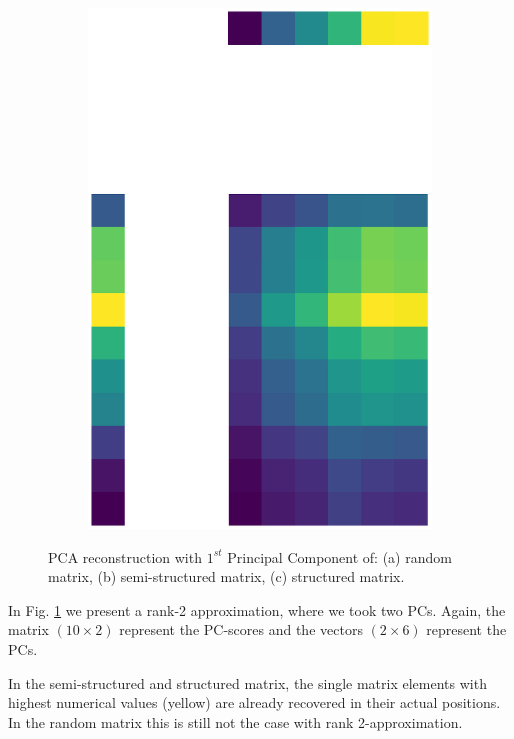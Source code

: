 \documentclass[10pt,twocolumn]{article}
\begin{document}
\begin{figure}[H]
\begin{subfigure}[t]{.15\textwidth}
\includegraphics[scale=.2]{DWGs/structured-matrix-reconstruction-PCs-1.eps}
\caption{ }
\end{subfigure}
\caption{PCA reconstruction with $1^{st}$ Principal Component of: (a) random matrix, (b) semi-structured matrix, (c) structured matrix.}
\label{fig:matrices-reconstruction}
\end{figure}

In Fig. \ref{fig:matrices-reconstruction} we present a rank-2 approximation, where we took two PCs. Again, the matrix $(10 \times 2)$ represent the PC-scores and the vectors $(2 \times 6)$ represent the PCs.

In the semi-structured and structured matrix, the single matrix elements with highest numerical values (yellow) are already recovered in their actual positions. In the random matrix this is still not the case with rank 2-approximation.
\end{document}
